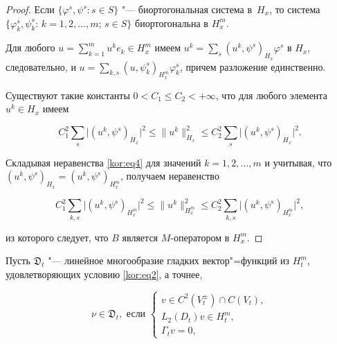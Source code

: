 \smallskip



\begin{proof} Если $\{\varphi^s, \psi^s:s\in S\}$ "--- биортогональная система в~$H_x$, то система $\{\varphi_k^s,\psi_k^s:\,k=1, 2, \ldots, m;\,s\in S\}$ биортогональна в $H_x^m$. 

Для любого $u=\sum_{k=1}^m{u^ke_k}\in H_x^m$ имеем $u^k=\sum _s{(u^k,\psi^s)_{H_x}\varphi^s}$ в $H_x$, следовательно, и $u=\sum_{k,s}{(u,\psi_k^s)_{H_x^m}}\varphi_k^s$, причем разложение единственно. 

Существуют такие константы $0<C_1\le C_2<+\infty$, что для любого элемента $u^k\in H_x$ имеем

\begin{equation}

\label{kor:eq4}

C_1^2\sum\limits_s \bigl|(u^k,\psi^s)_{H_x}\bigr|^2 

\le

\|u^k\|_{H_x }^2\le C_2^2 

\sum\limits_s \bigl|(u^k,\psi^s)_{H_x}\bigr|^2.

\end{equation}

Складывая неравенства \eqref{kor:eq4} для значений $k=1, 2,\dots,m$ и учитывая, что $(u^k,\psi^s)_{H_x}=(u^k,\psi^s)_{H_x^m}$, получаем неравенство

$$

C_1^2\sum\limits_{k,s} 

\bigl|(u^k,\psi^s)_{H_x^m}\bigr|^2\le\|u^k\|_{H_x^m}^2\le C_2^2\sum _{k,s} 

\bigl|(u^k,\psi^s)_{H_x^m}\bigr|^2,

$$

из которого следует, что $B$ является $M$-оператором в $H_x^m$. \end{proof}



\smallskip




Пусть $\mathfrak{D}_t$ "--- линейное многообразие гладких вектор"=функций из $H_t^m$, удовлетворяющих условию \eqref{kor:eq2}, а точнее,

\begin{equation}

\label{kor:eq1.5}

\nu\in\mathfrak{D}_t, \text{ если }

\left\{\begin{array}{l}

v\in C^2(V_t^\pm)\cap C(V_t),

\\

L_2(D_t)v\in H_t^m,

\\

\Gamma_t v=0,

\end{array}\right.

\end{equation}

